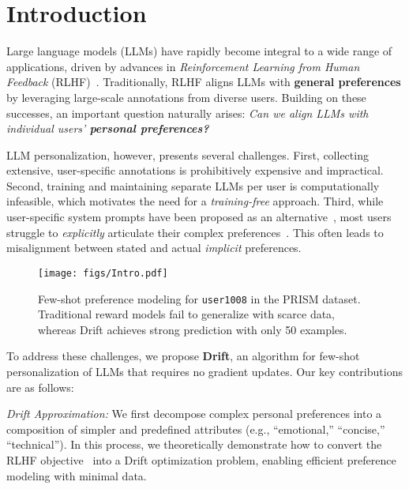 
\section{Introduction}

Large language models (LLMs) have rapidly become integral to a wide range of applications, driven by advances in \textit{Reinforcement Learning from Human Feedback} (RLHF)~\citep{ziegler2020finetune, rafailov2024direct}. Traditionally, RLHF aligns LLMs with \textbf{general preferences} by leveraging large-scale annotations from diverse users. Building on these successes, an important question naturally arises: \textit{Can we align LLMs with individual users’ \textbf{personal preferences?}}

LLM personalization, however, presents several challenges. First, collecting extensive, user-specific annotations is prohibitively expensive and impractical. Second, training and maintaining separate LLMs per user is computationally infeasible, which motivates the need for a \textit{training-free} approach. Third, while user-specific system prompts have been proposed as an alternative~\citep{hwang2023aligninglanguagemodelsuser, multifacet}, most users struggle to \textit{explicitly} articulate their complex preferences~\citep{nisbett1977telling, pronin2001you}. This often leads to misalignment between stated and actual \textit{implicit} preferences.

\begin{figure}[t!]
\centering
\texttt{[image: figs/Intro.pdf]}
\caption{Few-shot preference modeling for \texttt{user1008} in the PRISM dataset. 
Traditional reward models fail to generalize with scarce data, whereas Drift achieves strong prediction with only 50 examples.}
\label{fig:Intro}
\vspace{-5mm}
\end{figure}

To address these challenges, we propose \textbf{Drift}, an algorithm for few-shot personalization of LLMs that requires no gradient updates. Our key contributions are as follows:

\noindent
\textit{Drift Approximation:} We first decompose complex personal preferences into a composition of simpler and predefined attributes (e.g., ``emotional,'' ``concise,'' ``technical''). In this process, we theoretically demonstrate how to convert the RLHF objective~\citep{rafailov2024direct} into a Drift optimization problem, enabling efficient preference modeling with minimal data. 

